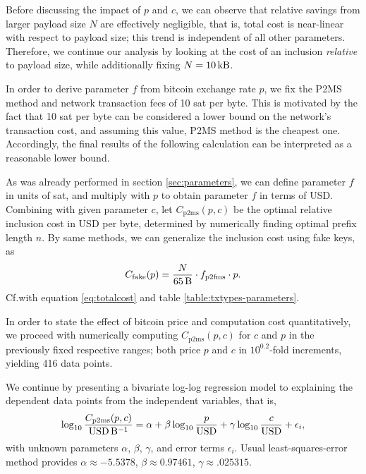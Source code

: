 \documentclass[a4paper,11pt,titlepage]{scrbook}
\begin{document}
Before discussing the impact of $p$ and $c$, we can observe that relative savings from larger payload size $N$ are effectively negligible, that is, total cost is near-linear with respect to payload size;
this trend is independent of all other parameters.
Therefore, we continue our analysis by looking at the cost of an inclusion \emph{relative} to payload size, while additionally fixing $N=\SI{10}{\kilo\byte}$.

In order to derive parameter $f$ from bitcoin exchange rate $p$, we fix the P2MS method and network transaction fees of 10 sat per byte.
%
%
This is motivated by the fact that 10 sat per byte can be considered a lower bound on the network's transaction cost, and assuming this value, P2MS method is the cheapest one.
Accordingly, the final results of the following calculation can be interpreted as a reasonable lower bound.

As was already performed in section \ref{sec:parameters}, we can define parameter $f$ in units of sat, and multiply with $p$ to obtain parameter $f$ in terms of USD.
Combining with given parameter $c$, let $C_\text{p2ms}(p,c)$ be the optimal relative inclusion cost in USD per byte, determined by numerically finding optimal prefix length $n$.
By same methods, we can generalize the inclusion cost using fake keys, as
\[ C_\text{fake}(p) = \frac{N}{\SI{65}{\byte}} \cdot f_\text{p2fms} \cdot p. \]
Cf.\@ with equation \ref{eq:totalcost} and table \ref{table:txtypes-parameters}.

In order to state the effect of bitcoin price and computation cost quantitatively, we proceed with numerically computing $C_\text{p2ms}(p,c)$ for $c$ and $p$ in the previously fixed respective ranges; both price $p$ and $c$ in $10^{0.2}$-fold increments, yielding 416 data points.

We continue by presenting a bivariate log-log regression model to explaining the dependent data points from the independent variables, that is,
\begin{equation} \log_{10} \frac{C_\text{p2ms}(p, c)}{\text{USD}\,\si{\per\byte}} = \alpha + \beta \log_{10} \frac{p}{\text{USD}} + \gamma \log_{10} \frac{c}{\text{USD}} + \epsilon_i, \label{eq:regressionmodel}\end{equation}
with unknown parameters $\alpha$, $\beta$, $\gamma$, and error terms $\epsilon_i$.
Usual least-squares-error method provides $\alpha \approx \num{-5.5378}$, $\beta \approx\num{0.97461}$, $\gamma \approx\num{.025315}$.
\end{document}
